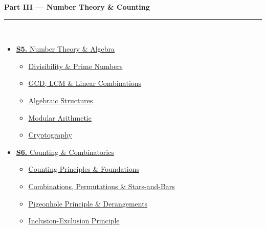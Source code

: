 \documentclass[12pt,a3paper]{article}
\begin{document}
\begin{tcolorbox}[breakable,colback=cC!5,colframe=cC,boxrule=1pt,arc=5pt,
  left=8pt,right=8pt,top=8pt,bottom=8pt,before skip=4pt]
  {\large\bfseries\textcolor{cC}{Part III --- Number Theory \& Counting}}\\[5pt]
  \textcolor{cC!40}{\rule{\textwidth}{0.4pt}}\\[3pt]
  \small\begin{itemize}[leftmargin=1.2em,itemsep=1pt,label={\textcolor{cC}{$\triangleright$}}]
    \item \hyperref[sec:S5]{\textbf{S5.} Number Theory \& Algebra}
      \begin{itemize}[leftmargin=1.5em,itemsep=0pt,label={\textcolor{cC}{$\cdot$}}]
        \item \hyperref[sub:s5-divisibility]{Divisibility \& Prime Numbers}
        \item \hyperref[sub:s5-gcdlcm]{GCD, LCM \& Linear Combinations}
        \item \hyperref[sub:s5-algebraic]{Algebraic Structures}
        \item \hyperref[sub:s5-modular]{Modular Arithmetic}
        \item \hyperref[sub:s5-cryptograpy]{Cryptography}
      \end{itemize}
    \item \hyperref[sec:S6]{\textbf{S6.} Counting \& Combinatorics}
      \begin{itemize}[leftmargin=1.5em,itemsep=0pt,label={\textcolor{cC}{$\cdot$}}]
        \item \hyperref[sub:s6-counting]{Counting Principles \& Foundations}
        \item \hyperref[sub:s6-combinations]{Combinations, Permutations \& Stars-and-Bars}
        \item \hyperref[sub:s6-pigeonhole]{Pigeonhole Principle \& Derangements}
        \item \hyperref[sub:s11-inclusion]{Inclusion-Exclusion Principle}
      \end{itemize}
  \end{itemize}
\end{tcolorbox}
\end{document}
